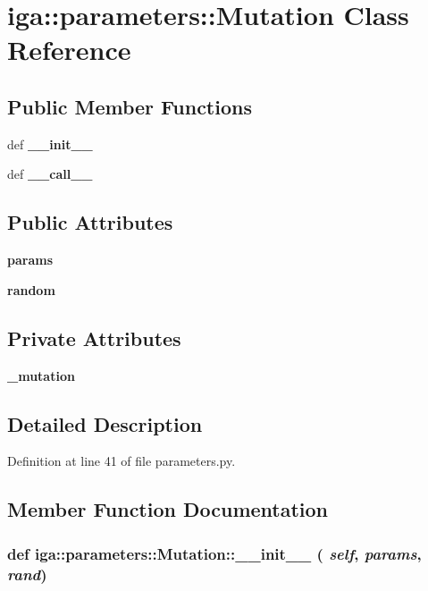 \section{iga::parameters::Mutation Class Reference}
\label{classiga_1_1parameters_1_1Mutation}
\subsection*{Public Member Functions}
\begin{CompactItemize}
\item 
def {\bf \_\-\_\-init\_\-\_\-}
\item 
def {\bf \_\-\_\-call\_\-\_\-}
\end{CompactItemize}
\subsection*{Public Attributes}
\begin{CompactItemize}
\item 
{\bf params}
\item 
{\bf random}
\end{CompactItemize}
\subsection*{Private Attributes}
\begin{CompactItemize}
\item 
{\bf \_\-mutation}
\end{CompactItemize}


\subsection{Detailed Description}


Definition at line 41 of file parameters.py.

\subsection{Member Function Documentation}
\subsubsection{\setlength{\rightskip}{0pt plus 5cm}def iga::parameters::Mutation::\_\-\_\-init\_\-\_\- ( {\em self},  {\em params},  {\em rand})}\label{classiga_1_1parameters_1_1Mutation_12b669335da90be148c20bc646d57a90}




